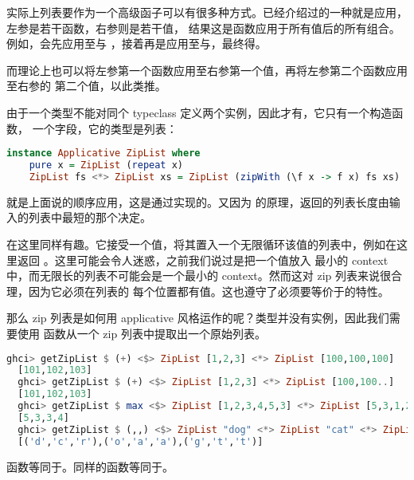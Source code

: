 \documentclass[./main.tex]{subfiles}
\begin{document}
实际上列表要作为一个高级函子可以有很多种方式。已经介绍过的一种就是应用\acode{<*>}，左参是若干函数，右参则是若干值，
结果这是函数应用于所有值后的所有组合。例如\acode{[(+3),(*2)] <*> [1,2]}，会先应用至与
，接着再是应用至与，最终得\acode{[4,5,2,4]}。

而\acode{[(+3),(*2)] <*> [1,2]}理论上也可以将左参第一个函数应用至右参第一个值，再将左参第二个函数应用至右参的
第二个值，以此类推。

由于一个类型不能对同个 typeclass 定义两个实例，因此才有，它只有一个构造函数，
一个字段，它的类型是列表：

\begin{lstlisting}[language=Haskell]
  instance Applicative ZipList where
    pure x = ZipList (repeat x)
    ZipList fs <*> ZipList xs = ZipList (zipWith (\f x -> f x) fs xs)
\end{lstlisting}

\acode{<*>}就是上面说的顺序应用，这是通过实现的。又因为
的原理，返回的列表长度由输入的列表中最短的那个决定。

在这里同样有趣。它接受一个值，将其置入一个无限循环该值的列表中，例如在这里返回
\acode{ZipList (["haha", "haha", "haha" ...)}。这里可能会令人迷惑，之前我们说过是把一个值放入
最小的 context 中，而无限长的列表不可能会是一个最小的 context。然而这对 zip 列表来说很合理，因为它必须在列表的
每个位置都有值。这也遵守了必须要等价于的特性。

那么 zip 列表是如何用 applicative 风格运作的呢？类型并没有实例，因此我们需要使用
函数从一个 zip 列表中提取出一个原始列表。

\begin{lstlisting}[language=Haskell]
  ghci> getZipList $ (+) <$> ZipList [1,2,3] <*> ZipList [100,100,100]
  [101,102,103]
  ghci> getZipList $ (+) <$> ZipList [1,2,3] <*> ZipList [100,100..]
  [101,102,103]
  ghci> getZipList $ max <$> ZipList [1,2,3,4,5,3] <*> ZipList [5,3,1,2]
  [5,3,3,4]
  ghci> getZipList $ (,,) <$> ZipList "dog" <*> ZipList "cat" <*> ZipList "rat"
  [('d','c','r'),('o','a','a'),('g','t','t')]
\end{lstlisting}

\begin{anote}
  \acode{(,,)}函数等同于。同样的\acode{(,)}函数等同于。
\end{anote}
\end{document}
